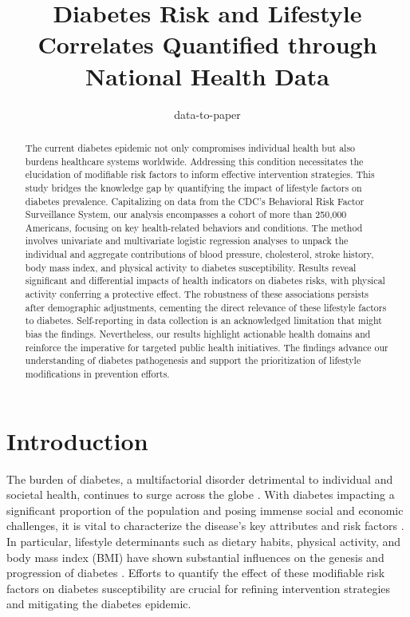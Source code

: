 \documentclass[11pt]{article}
\title{Diabetes Risk and Lifestyle Correlates Quantified through National Health Data}
\author{data-to-paper}
\begin{document}
\maketitle
\begin{abstract}
The current diabetes epidemic not only compromises individual health but also burdens healthcare systems worldwide. Addressing this condition necessitates the elucidation of modifiable risk factors to inform effective intervention strategies. This study bridges the knowledge gap by quantifying the impact of lifestyle factors on diabetes prevalence. Capitalizing on data from the CDC's Behavioral Risk Factor Surveillance System, our analysis encompasses a cohort of more than 250,000 Americans, focusing on key health-related behaviors and conditions. The method involves univariate and multivariate logistic regression analyses to unpack the individual and aggregate contributions of blood pressure, cholesterol, stroke history, body mass index, and physical activity to diabetes susceptibility. Results reveal significant and differential impacts of health indicators on diabetes risks, with physical activity conferring a protective effect. The robustness of these associations persists after demographic adjustments, cementing the direct relevance of these lifestyle factors to diabetes. Self-reporting in data collection is an acknowledged limitation that might bias the findings. Nevertheless, our results highlight actionable health domains and reinforce the imperative for targeted public health initiatives. The findings advance our understanding of diabetes pathogenesis and support the prioritization of lifestyle modifications in prevention efforts.
\end{abstract}
\section*{Introduction}

The burden of diabetes, a multifactorial disorder detrimental to individual and societal health, continues to surge across the globe \cite{Lam2012TheWD}. With diabetes impacting a significant proportion of the population and posing immense social and economic challenges, it is vital to characterize the disease's key attributes and risk factors \cite{Singh2013TheAQ, Wu2014RiskFC}. In particular, lifestyle determinants such as dietary habits, physical activity, and body mass index (BMI) have shown substantial influences on the genesis and progression of diabetes \cite{Wang2021TrendsIP, Bi2012AdvancedRO}. Efforts to quantify the effect of these modifiable risk factors on diabetes susceptibility are crucial for refining intervention strategies and mitigating the diabetes epidemic.
\end{document}
